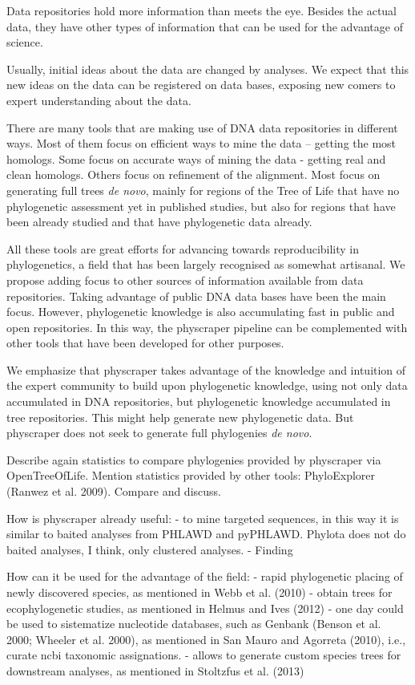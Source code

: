 \documentclass[draft]{ametsoc}
\begin{document}
Data repositories hold more information than meets the eye. Besides the
actual data, they have other types of information that can be used for
the advantage of science.

Usually, initial ideas about the data are changed by analyses. We expect
that this new ideas on the data can be registered on data bases,
exposing new comers to expert understanding about the data.

There are many tools that are making use of DNA data repositories in
different ways. Most of them focus on efficient ways to mine the data --
getting the most homologs. Some focus on accurate ways of mining the
data - getting real and clean homologs. Others focus on refinement of
the alignment. Most focus on generating full trees \emph{de novo},
mainly for regions of the Tree of Life that have no phylogenetic
assessment yet in published studies, but also for regions that have been
already studied and that have phylogenetic data already.

All these tools are great efforts for advancing towards reproducibility
in phylogenetics, a field that has been largely recognised as somewhat
artisanal. We propose adding focus to other sources of information
available from data repositories. Taking advantage of public DNA data
bases have been the main focus. However, phylogenetic knowledge is also
accumulating fast in public and open repositories. In this way, the
physcraper pipeline can be complemented with other tools that have been
developed for other purposes.

We emphasize that physcraper takes advantage of the knowledge and
intuition of the expert community to build upon phylogenetic knowledge,
using not only data accumulated in DNA repositories, but phylogenetic
knowledge accumulated in tree repositories. This might help generate new
phylogenetic data. But physcraper does not seek to generate full
phylogenies \emph{de novo}.

Describe again statistics to compare phylogenies provided by physcraper
via OpenTreeOfLife. Mention statistics provided by other tools:
PhyloExplorer (Ranwez et al. 2009). Compare and discuss.

How is physcraper already useful: - to mine targeted sequences, in this
way it is similar to baited analyses from PHLAWD and pyPHLAWD. Phylota
does not do baited analyses, I think, only clustered analyses. - Finding

How can it be used for the advantage of the field: - rapid phylogenetic
placing of newly discovered species, as mentioned in Webb et al. (2010)
- obtain trees for ecophylogenetic studies, as mentioned in Helmus and
Ives (2012) - one day could be used to sistematize nucleotide databases,
such as Genbank (Benson et al. 2000; Wheeler et al. 2000), as mentioned
in San Mauro and Agorreta (2010), i.e., curate ncbi taxonomic
assignations. - allows to generate custom species trees for downstream
analyses, as mentioned in Stoltzfus et al. (2013)
\end{document}
